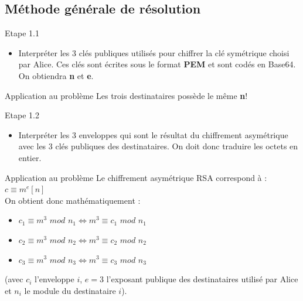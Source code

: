 \documentclass{beamer}
\begin{document}
	\subsection{Méthode générale de résolution}
    \begin{frame}
	\begin{block}{Etape 1.1}
		\begin{itemize}
		\item Interpréter les 3 clés publiques utilisés pour chiffrer la clé symétrique choisi par Alice. Ces clés sont écrites sous le format \textbf{PEM} et sont codés en Base64. On obtiendra \textbf{n} et \textbf{e}.
		\end{itemize}
	\end{block}
	\begin{exampleblock}{Application au problème}
		Les trois destinataires possède le même \textbf{n}!
	\end{exampleblock}
	\end{frame}
	\begin{frame}
	\begin{block}{Etape 1.2}
		\begin{itemize}
			\item Interpréter les 3 enveloppes qui sont le résultat du chiffrement asymétrique avec les 3 clés publiques des destinataires. On doit donc traduire les octets en entier.
		\end{itemize}
	\end{block}

	\begin{exampleblock}{Application au problème}
		Le chiffrement asymétrique RSA correspond à : $c \equiv m^e [n]$ \\
		On obtient donc mathématiquement :
		\begin{itemize}
			\item $c_1 \equiv m^3$ $mod$ $n_1 \Leftrightarrow m^3 \equiv c_1$ $mod$ $n_1$
			\item $c_2 \equiv m^3$ $mod$ $n_2\Leftrightarrow m^3 \equiv c_2$ $mod$ $n_2$
			\item $c_3 \equiv m^3$ $mod$ $n_3\Leftrightarrow m^3 \equiv c_3$ $mod$ $n_3$
		\end{itemize}
		(avec $c_i$ l'enveloppe $i$, $e=3$ l'exposant publique des destinataires utilisé par Alice et $n_i$ le module du destinataire $i$).
	\end{exampleblock}
	\end{frame}
\end{document}
